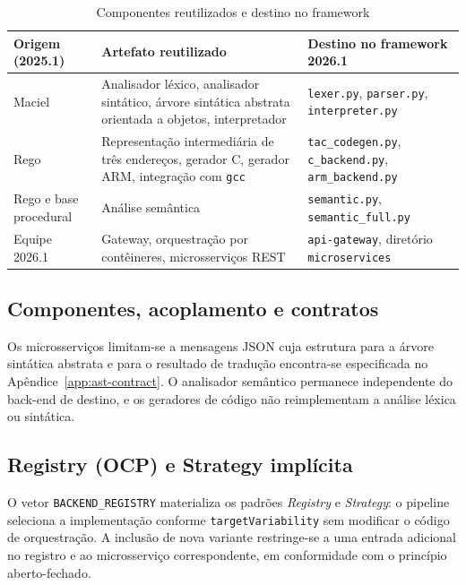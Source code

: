 \documentclass[12pt]{article}
\begin{document}
\begin{table}[htbp]
\centering
\small
\caption{Componentes reutilizados e destino no framework}
\label{tab:reuse-map}
\begin{tabularx}{\textwidth}{|>{\raggedright\arraybackslash}p{2.4cm}|X|>{\raggedright\arraybackslash}p{4.2cm}|}
\hline
\textbf{Origem (2025.1)} & \textbf{Artefato reutilizado} & \textbf{Destino no framework 2026.1} \\
\hline
Maciel \cite{maciel2025} & Analisador léxico, analisador sintático, árvore sintática abstrata orientada a objetos, interpretador & \texttt{lexer.py}, \texttt{parser.py}, \texttt{interpreter.py} \\
Rego \cite{rego2025} & Representação intermediária de três endereços, gerador C, gerador ARM, integração com \texttt{gcc} & \texttt{tac\_codegen.py}, \texttt{c\_backend.py}, \texttt{arm\_backend.py} \\
Rego e base procedural & Análise semântica & \texttt{semantic.py}, \texttt{semantic\_full.py} \\
Equipe 2026.1 & Gateway, orquestração por contêineres, microsserviços REST & \texttt{api-gateway}, diretório \texttt{microservices} \\
\hline
\end{tabularx}
\end{table}

\subsection{Componentes, acoplamento e contratos}

Os microsserviços limitam-se a mensagens JSON cuja estrutura para a árvore sintática abstrata e para o resultado de tradução encontra-se especificada no Apêndice~\ref{app:ast-contract}. O analisador semântico permanece independente do back-end de destino, e os geradores de código não reimplementam a análise léxica ou sintática.

\subsection{Registry (OCP) e Strategy implícita}
O vetor \texttt{BACKEND\_REGISTRY} materializa os padrões \emph{Registry} e \emph{Strategy}: o pipeline seleciona a implementação conforme \texttt{targetVariability} sem modificar o código de orquestração. A inclusão de nova variante restringe-se a uma entrada adicional no registro e ao microsserviço correspondente, em conformidade com o princípio aberto-fechado.
\end{document}
